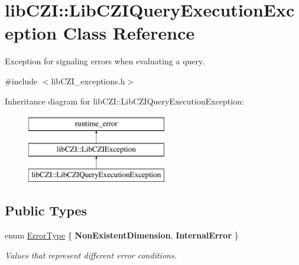 \hypertarget{classlib_c_z_i_1_1_lib_c_z_i_query_execution_exception}{}\section{lib\+C\+ZI\+:\+:Lib\+C\+Z\+I\+Query\+Execution\+Exception Class Reference}
\label{classlib_c_z_i_1_1_lib_c_z_i_query_execution_exception}


Exception for signaling errors when evaluating a query.  




{\ttfamily \#include $<$lib\+C\+Z\+I\+\_\+exceptions.\+h$>$}

Inheritance diagram for lib\+C\+ZI\+:\+:Lib\+C\+Z\+I\+Query\+Execution\+Exception\+:\begin{figure}[H]
\begin{center}
\leavevmode
\includegraphics[height=3.000000cm]{classlib_c_z_i_1_1_lib_c_z_i_query_execution_exception}
\end{center}
\end{figure}
\subsection*{Public Types}
\begin{DoxyCompactItemize}
\item 
\mbox{\label{classlib_c_z_i_1_1_lib_c_z_i_query_execution_exception_a7420fe8895248c44d16cf34f23f0c6a2}} 
enum \hyperlink{classlib_c_z_i_1_1_lib_c_z_i_query_execution_exception_a7420fe8895248c44d16cf34f23f0c6a2}{Error\+Type} \{ {\bfseries Non\+Existent\+Dimension}, 
{\bfseries Internal\+Error}
 \}\begin{DoxyCompactList}\small\item\em Values that represent different error conditions. \end{DoxyCompactList}
\end{DoxyCompactItemize}
